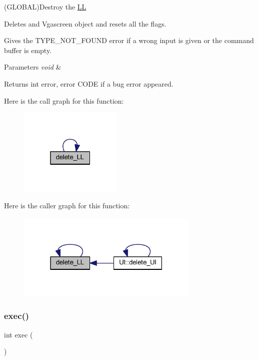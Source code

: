 (G\+L\+O\+B\+AL)Destroy the \mbox{\hyperlink{namespace_l_l}{LL}} 

Deletes and Vgascreen object and resets all the flags.

Gives the T\+Y\+P\+E\+\_\+\+N\+O\+T\+\_\+\+F\+O\+U\+ND error if a wrong input is given or the command buffer is empty.


\begin{DoxyParams}{Parameters}
{\em void} & \\
\hline
\end{DoxyParams}
\begin{DoxyReturn}{Returns}
int error, error C\+O\+DE if a bug error appeared. 
\end{DoxyReturn}
Here is the call graph for this function\+:\nopagebreak
\begin{figure}[H]
\begin{center}
\leavevmode
\includegraphics[width=139pt]{namespace_l_l_a78899c6737310be03f8a2f05f9d7e09e_cgraph}
\end{center}
\end{figure}
Here is the caller graph for this function\+:\nopagebreak
\begin{figure}[H]
\begin{center}
\leavevmode
\includegraphics[width=247pt]{namespace_l_l_a78899c6737310be03f8a2f05f9d7e09e_icgraph}
\end{center}
\end{figure}
\mbox{\label{namespace_l_l_ac98bc19f4e3468b76cfc2e43456527cc}} 
\subsubsection{\texorpdfstring{exec()}{exec()}}
{\footnotesize\ttfamily int exec (\begin{DoxyParamCaption}\item[{void}]{ }\end{DoxyParamCaption})}



